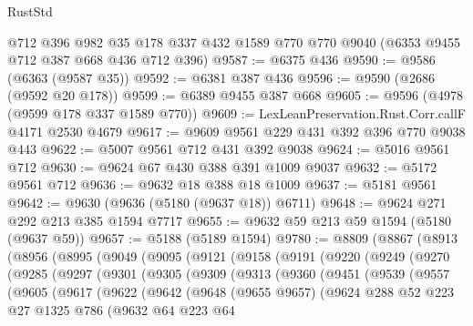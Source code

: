 \begin{lexlean}{RustStd}
\begin{coremodule}
    @712
    @396
    @982
    @35
    @178
    @337
    @432
    @1589
    @770
    @770
    @9040
    (@6353 @9455 @712 @387 @668 @436 @712 @396)
@9587 := @6375 @436
@9590 := @9586 (@6363 (@9587 @35))
@9592 := @6381 @387 @436
@9596 := @9590 (@2686 (@9592 @20 @178))
@9599 := @6389 @9455 @387 @668
@9605 := @9596 (@4978 (@9599 @178 @337 @1589 @770))
@9609 := LexLeanPreservation.Rust.Corr.callF @4171 @2530 @4679
@9617 := @9609 @9561 @229 @431 @392 @396 @770 @9038 @443
@9622 := @5007 @9561 @712 @431 @392 @9038
@9624 := @5016 @9561 @712
@9630 := @9624 @67 @430 @388 @391 @1009 @9037
@9632 := @5172 @9561 @712
@9636 := @9632 @18 @388 @18 @1009
@9637 := @5181 @9561
@9642 := @9630 (@9636 (@5180 (@9637 @18)) @6711)
@9648 := @9624 @271 @292 @213 @385 @1594 @7717
@9655 := @9632 @59 @213 @59 @1594 (@5180 (@9637 @59))
@9657 := @5188 (@5189 @1594)
@9780 := @8809
    (@8867
      (@8913
        (@8956
          (@8995
            (@9049
              (@9095
                (@9121
                  (@9158
                    (@9191
                      (@9220
                        (@9249
                          (@9270
                            (@9285
                              (@9297
                                (@9301
                                  (@9305
                                    (@9309
                                      (@9313
                                        (@9360
                                          (@9451
                                            (@9539
                                              (@9557
                                                (@9605
                                                  (@9617
                                                    (@9622
                                                      (@9642
                                                        (@9648
                                                          (@9655 @9657)
                                                          (@9624
                                                            @288
                                                            @52
                                                            @223
                                                            @27
                                                            @1325
                                                            @786
                                                            (@9632
                                                              @64
                                                              @223
                                                              @64

\end{coremodule}
\end{lexlean}
